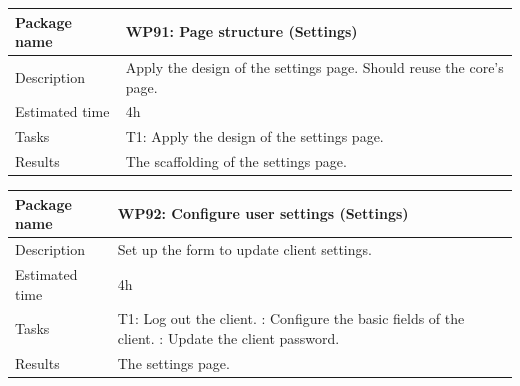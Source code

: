 \documentclass[a4paper, 12pt, oneside]{book}
\begin{document}
\vspace*{16pt}
\begin{tabularx}{\textwidth}{| l | X |}
	\hline
	\rowcolor{rowColor}
	{\semibf Package name}   & {\semibf WP91}: Page structure (Settings)                            \\
	\hline
	{\semibf Description}    & Apply the design of the settings page. Should reuse the core's page. \\
	\hline
	\rowcolor{rowColor}
	{\semibf Estimated time} & 4h                                                                   \\
	\hline
	{\semibf Tasks}          & {\semibf T1}: Apply the design of the settings page.                 \\
	\hline
	\rowcolor{rowColor}
	{\semibf Results}        & The scaffolding of the settings page.                                \\
	\hline
\end{tabularx}
\vspace*{16pt}
\begin{tabularx}{\textwidth}{| l | X |}
	\hline
	\rowcolor{rowColor}
	{\semibf Package name}   & {\semibf WP92}: Configure user settings (Settings) \\
	\hline
	{\semibf Description}    & Set up the form to update client settings.         \\
	\hline
	\rowcolor{rowColor}
	{\semibf Estimated time} & 4h                                                 \\
	\hline
	{\semibf Tasks}          & {\semibf T1}: Log out the client.
	\newline {\semibf T2}: Configure the basic fields of the client.
	\newline {\semibf T3}: Update the client password.                            \\
	\hline
	\rowcolor{rowColor}
	{\semibf Results}        & The settings page.                                 \\
	\hline
\end{tabularx}
\end{document}
